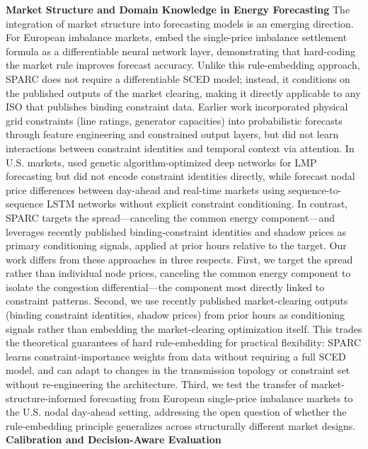 \documentclass[twoside]{article}
\begin{document}
\textbf{Market Structure and Domain Knowledge in Energy Forecasting}
The integration of market structure into forecasting models is an emerging direction. For European imbalance markets, \cite{yu2026marketruleinformed} embed the single-price imbalance settlement formula as a differentiable neural network layer, demonstrating that hard-coding the market rule improves forecast accuracy. Unlike this rule-embedding approach, SPARC does not require a differentiable SCED model; instead, it conditions on the published outputs of the market clearing, making it directly applicable to any ISO that publishes binding constraint data. Earlier work \cite{toubeau2021interpretable} incorporated physical grid constraints (line ratings, generator capacities) into probabilistic forecasts through feature engineering and constrained output layers, but did not learn interactions between constraint identities and temporal context via attention. In U.S. markets, \cite{hong2020locational} used genetic algorithm-optimized deep networks for LMP forecasting but did not encode constraint identities directly, while \cite{das2021forecasting} forecast nodal price differences between day-ahead and real-time markets using sequence-to-sequence LSTM networks without explicit constraint conditioning. In contrast, SPARC targets the spread---canceling the common energy component---and leverages recently published binding-constraint identities and shadow prices as primary conditioning signals, applied at prior hours relative to the target.
Our work differs from these approaches in three respects. First, we target the spread rather than individual node prices, canceling the common energy component to isolate the congestion differential---the component most directly linked to constraint patterns. Second, we use recently published market-clearing outputs (binding constraint identities, shadow prices) from prior hours as conditioning signals rather than embedding the market-clearing optimization itself. This trades the theoretical guarantees of hard rule-embedding for practical flexibility: SPARC learns constraint-importance weights from data without requiring a full SCED model, and can adapt to changes in the transmission topology or constraint set without re-engineering the architecture. Third, we test the transfer of market-structure-informed forecasting from European single-price imbalance markets to the U.S. nodal day-ahead setting, addressing the open question of whether the rule-embedding principle generalizes across structurally different market designs.
\textbf{Calibration and Decision-Aware Evaluation}
\end{document}
